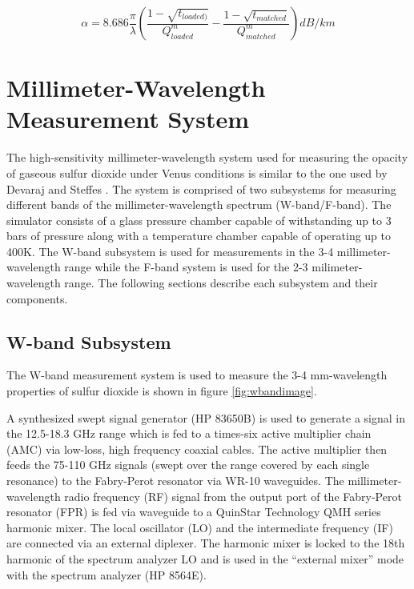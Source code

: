 \begin{equation} \label{eq:alphamatch}
\alpha = 8.686 \frac{\pi}{\lambda}\left(\frac{1 - \sqrt{t_{loaded)}}}{Q^m_{loaded}} - \frac{1-\sqrt{t_{matched}}}{Q_{matched}^m} \right) dB/km
\end{equation}

\section{Millimeter-Wavelength Measurement System}

The high-sensitivity millimeter-wavelength system used for measuring the opacity of gaseous sulfur dioxide under Venus conditions is similar to the one used by Devaraj and Steffes \cite{Devaraj-2011} \cite{Devaraj-thesis}. The system is comprised of two subsystems for measuring different bands of the millimeter-wavelength spectrum (W-band/F-band). The simulator consists of a glass pressure chamber capable of withstanding up to 3 bars of pressure along with a temperature chamber capable of operating up to 400K. The W-band subsystem is used for measurements in the 3-4 millimeter-wavelength range while the F-band system is used for the 2-3 milimeter-wavelength range. The following sections describe each subsystem and their components. 

\subsection{W-band Subsystem}

The W-band measurement system is used to measure the 3-4 mm-wavelength properties of sulfur dioxide is shown in figure \ref{fig:wbandimage}.

A synthesized swept signal generator (HP 83650B) is used to generate a signal in the 12.5-18.3 GHz range which is fed to a times-six active multiplier chain (AMC) via low-loss, high frequency coaxial cables. The active multiplier then feeds the 75-110 GHz signals (swept over the range covered by each single resonance) to the Fabry-Perot resonator via WR-10 waveguides. The millimeter-wavelength radio frequency (RF) signal from the output port of the Fabry-Perot resonator (FPR) is fed via waveguide to a QuinStar Technology QMH series harmonic mixer. The local oscillator (LO) and the intermediate frequency (IF) are connected via an external diplexer. The harmonic mixer is locked to the 18th harmonic of the spectrum analyzer LO and is used in the ``external mixer'' mode with the spectrum analyzer (HP 8564E). 

